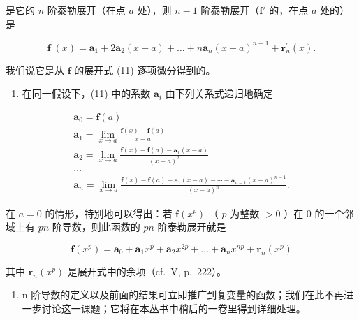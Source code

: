 是它的 \(n\) 阶泰勒展开（在点 \(a\) 处），则 \(n - 1\) 阶泰勒展开（\(\mathbf{f}'\) 的，在点 \(a\) 处的）是

\[
\mathbf {f} ^ {\prime} (x) = \mathbf {a} _ {1} + 2 \mathbf {a} _ {2} (x - a) + \dots + n \mathbf {a} _ {n} (x - a) ^ {n - 1} + \mathbf {r} _ {n} ^ {\prime} (x).\tag{12}
\]

我们说它是从 \(\mathbf{f}\) 的展开式 (11) 逐项微分得到的。

\begin{enumerate}
\def\labelenumi{\arabic{enumi})}
\setcounter{enumi}{1}
\tightlist
\item
  在同一假设下，(11) 中的系数 \(\mathbf{a}_i\) 由下列关系式递归地确定
\end{enumerate}

\[
\begin{array}{l} \mathbf {a} _ {0} = \mathbf {f} (a) \\ \mathbf {a} _ {1} = \lim _ {x \to a} \frac {\mathbf {f} (x) - \mathbf {f} (a)}{x - a} \\ \mathbf {a} _ {2} = \lim _ {x \to a} \frac {\mathbf {f} (x) - \mathbf {f} (a) - \mathbf {a} _ {1} (x - a)}{(x - a) ^ {2}} \\ \dots \\ \mathbf {a} _ {n} = \lim _ {x \to a} \frac {\mathbf {f} (x) - \mathbf {f} (a) - \mathbf {a} _ {1} (x - a) - \cdots - \mathbf {a} _ {n - 1} (x - a) ^ {n - 1}}{(x - a) ^ {n}}. \end{array}
\]

在 \(a = 0\) 的情形，特别地可以得出：若 \(\mathbf{f}(x^p)\) （ \(p\) 为整数 \(> 0\) ）在 0 的一个邻域上有 \(pn\) 阶导数，则此函数的 \(pn\) 阶泰勒展开就是

\[
\mathbf {f} (x ^ {p}) = \mathbf {a} _ {0} + \mathbf {a} _ {1} x ^ {p} + \mathbf {a} _ {2} x ^ {2 p} + \dots + \mathbf {a} _ {n} x ^ {n p} + \mathbf {r} _ {n} (x ^ {p})\tag{13}
\]

其中 \(\mathbf{r}_{n}(x^{p})\) 是展开式中的余项（cf.~V, p.~222）。

\begin{enumerate}
\def\labelenumi{\arabic{enumi})}
\setcounter{enumi}{2}
\tightlist
\item
  n 阶导数的定义以及前面的结果可立即推广到复变量的函数；我们在此不再进一步讨论这一课题；它将在本丛书中稍后的一卷里得到详细处理。
\end{enumerate}

